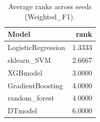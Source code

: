 \begin{table}[t]
\centering
\begin{tabular}{lr}
\toprule
Model & rank \\
\midrule
LogisticRegression & 1.3333 \\
sklearn_SVM & 2.6667 \\
XGBmodel & 3.0000 \\
GradientBoosting & 4.0000 \\
random_forest & 4.0000 \\
DTmodel & 6.0000 \\
\bottomrule
\end{tabular}
\caption{Average ranks across seeds (Weighted_F1).}
\label{tab:avg_rank_Weighted_F1}
\end{table}